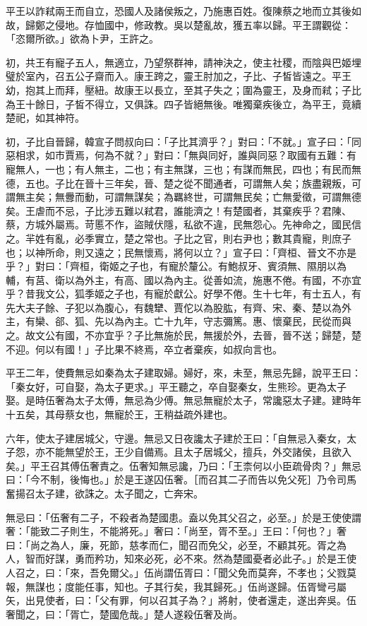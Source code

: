 \begin{pinyinscope}
平王以詐弒兩王而自立，恐國人及諸侯叛之，乃施惠百姓。復陳蔡之地而立其後如故，歸鄭之侵地。存恤國中，修政教。吳以楚亂故，獲五率以歸。平王謂觀從：「恣爾所欲。」欲為卜尹，王許之。

初，共王有寵子五人，無適立，乃望祭群神，請神決之，使主社稷，而陰與巴姬埋璧於室內，召五公子齋而入。康王跨之，靈王肘加之，子比、子皙皆遠之。平王幼，抱其上而拜，壓紐。故康王以長立，至其子失之；圍為靈王，及身而弒；子比為王十餘日，子皙不得立，又俱誅。四子皆絕無後。唯獨棄疾後立，為平王，竟續楚祀，如其神符。

初，子比自晉歸，韓宣子問叔向曰：「子比其濟乎？」對曰：「不就。」宣子曰：「同惡相求，如市賈焉，何為不就？」對曰：「無與同好，誰與同惡？取國有五難：有寵無人，一也；有人無主，二也；有主無謀，三也；有謀而無民，四也；有民而無德，五也。子比在晉十三年矣，晉、楚之從不聞通者，可謂無人矣；族盡親叛，可謂無主矣；無釁而動，可謂無謀矣；為羈終世，可謂無民矣；亡無愛徵，可謂無德矣。王虐而不忌，子比涉五難以弒君，誰能濟之！有楚國者，其棄疾乎？君陳、蔡，方城外屬焉。苛慝不作，盜賊伏隱，私欲不違，民無怨心。先神命之，國民信之。羋姓有亂，必季實立，楚之常也。子比之官，則右尹也；數其貴寵，則庶子也；以神所命，則又遠之；民無懷焉，將何以立？」宣子曰：「齊桓、晉文不亦是乎？」對曰：「齊桓，衛姬之子也，有寵於釐公。有鮑叔牙、賓須無、隰朋以為輔，有莒、衛以為外主，有高、國以為內主。從善如流，施惠不倦。有國，不亦宜乎？昔我文公，狐季姬之子也，有寵於獻公。好學不倦。生十七年，有士五人，有先大夫子餘、子犯以為腹心，有魏犫、賈佗以為股肱，有齊、宋、秦、楚以為外主，有欒、郤、狐、先以為內主。亡十九年，守志彌篤。惠、懷棄民，民從而與之。故文公有國，不亦宜乎？子比無施於民，無援於外，去晉，晉不送；歸楚，楚不迎。何以有國！」子比果不終焉，卒立者棄疾，如叔向言也。

平王二年，使費無忌如秦為太子建取婦。婦好，來，未至，無忌先歸，說平王曰：「秦女好，可自娶，為太子更求。」平王聽之，卒自娶秦女，生熊珍。更為太子娶。是時伍奢為太子太傅，無忌為少傅。無忌無寵於太子，常讒惡太子建。建時年十五矣，其母蔡女也，無寵於王，王稍益疏外建也。

六年，使太子建居城父，守邊。無忌又日夜讒太子建於王曰：「自無忌入秦女，太子怨，亦不能無望於王，王少自備焉。且太子居城父，擅兵，外交諸侯，且欲入矣。」平王召其傅伍奢責之。伍奢知無忌讒，乃曰：「王柰何以小臣疏骨肉？」無忌曰：「今不制，後悔也。」於是王遂囚伍奢。［而召其二子而告以免父死］乃令司馬奮揚召太子建，欲誅之。太子聞之，亡奔宋。

無忌曰：「伍奢有二子，不殺者為楚國患。盍以免其父召之，必至。」於是王使使謂奢：「能致二子則生，不能將死。」奢曰：「尚至，胥不至。」王曰：「何也？」奢曰：「尚之為人，廉，死節，慈孝而仁，聞召而免父，必至，不顧其死。胥之為人，智而好謀，勇而矜功，知來必死，必不來。然為楚國憂者必此子。」於是王使人召之，曰：「來，吾免爾父。」伍尚謂伍胥曰：「聞父免而莫奔，不孝也；父戮莫報，無謀也；度能任事，知也。子其行矣，我其歸死。」伍尚遂歸。伍胥彎弓屬矢，出見使者，曰：「父有罪，何以召其子為？」將射，使者還走，遂出奔吳。伍奢聞之，曰：「胥亡，楚國危哉。」楚人遂殺伍奢及尚。


\end{pinyinscope}
